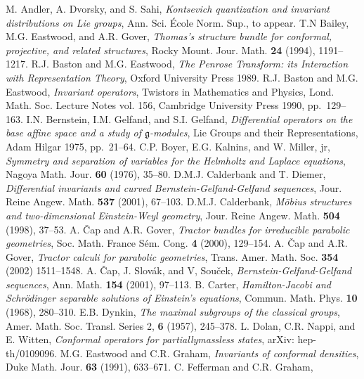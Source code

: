 \documentclass[a4paper,12pt]{amsart}
\begin{document}
\begin{thebibliography}{XX}
 M. Andler, A. Dvorsky, and S. Sahi,
{\em Kontsevich quantization and invariant distributions on Lie groups},
Ann. Sci. \'Ecole Norm. Sup., to appear.
 T.N Bailey, M.G. Eastwood, and A.R. Gover,
{\em Thomas's structure bundle for conformal, projective, and related
structures},
Rocky Mount. Jour. Math. {\bf 24} (1994), 1191--1217.
 R.J. Baston and M.G. Eastwood,
{\em The Penrose Transform: its Interaction with Representation Theory},
Oxford University Press 1989.
 R.J. Baston and M.G. Eastwood,
{\em Invariant operators},
Twistors in Mathematics and Physics,
Lond. Math. Soc. Lecture
Notes vol. 156, Cambridge University Press 1990, pp.~129--163.
 I.N. Bernstein, I.M. Gelfand, and S.I. Gelfand,
{\em Differential operators on the base affine space and a study of
${\mathfrak g}$-modules},
Lie Groups and their Representations, Adam Hilgar 1975, pp.~21--64.
 C.P. Boyer, E.G. Kalnins, and W. Miller, jr,
{\em Symmetry and separation of variables for the Helmholtz and Laplace
equations},
Nagoya Math. Jour. {\bf 60} (1976), 35--80.
 D.M.J. Calderbank and T. Diemer,\quad
{\em Differential invariants and curved Bernstein-Gelfand-Gelfand sequences},
Jour. Reine Angew. Math. {\bf 537} (2001), 67--103.
 D.M.J. Calderbank,
{\em M\"obius structures and two-dimensional Einstein-Weyl geometry},
Jour. Reine Angew. Math. {\bf 504} (1998), 37--53.
 A. \v{C}ap and A.R. Gover,
{\em Tractor bundles for irreducible parabolic geometries},
Soc. Math. France S\'em. Cong. {\bf 4} (2000), 129--154.
 A. \v{C}ap and A.R. Gover,
{\em Tractor calculi for parabolic geometries},
Trans. Amer. Math. Soc. {\bf 354} (2002) 1511--1548.
 A. \v{C}ap, J. Slov\'ak, and V, Sou\v{c}ek,
{\em Bernstein-Gelfand-Gelfand sequences},
Ann. Math. {\bf 154} (2001), 97--113.
 B. Carter,
{\em Hamilton-Jacobi and Schr\"odinger separable solutions of Einstein's
equations},
Commun. Math. Phys. {\bf 10} (1968), 280--310.
 E.B. Dynkin, {\em The maximal subgroups of the classical groups},
Amer. Math. Soc. Transl. Series 2, {\bf 6} (1957), 245--378.
 L. Dolan, C.R. Nappi, and E. Witten,
{\em Conformal operators for partially\linebreak massless states},
arXiv: hep-th/0109096.
 M.G. Eastwood and C.R. Graham,
{\em Invariants of conformal densities},
Duke Math. Jour. {\bf 63} (1991), 633--671.
 C. Fefferman and C.R. Graham,

\end{thebibliography}
\end{document}
